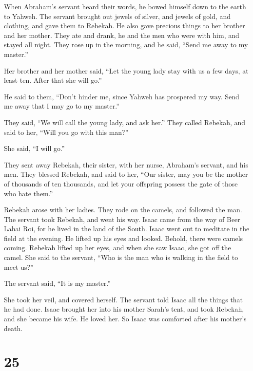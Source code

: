  When Abraham's servant heard their words, he bowed
himself down to the earth to Yahweh.  The servant brought
out jewels of silver, and jewels of gold, and clothing, and gave them to
Rebekah. He also gave precious things to her brother and her mother.
 They ate and drank, he and the men who were with him,
and stayed all night. They rose up in the morning, and he said, ``Send
me away to my master.''

 Her brother and her mother said, ``Let the young lady
stay with us a few days, at least ten. After that she will go.''

 He said to them, ``Don't hinder me, since Yahweh has
prospered my way. Send me away that I may go to my master.''

 They said, ``We will call the young lady, and ask her.''
 They called Rebekah, and said to her, ``Will you go with
this man?''

She said, ``I will go.''

 They sent away Rebekah, their sister, with her nurse,
Abraham's servant, and his men.  They blessed Rebekah,
and said to her, ``Our sister, may you be the mother of thousands of ten
thousands, and let your offspring possess the gate of those who hate
them.''

 Rebekah arose with her ladies. They rode on the camels,
and followed the man. The servant took Rebekah, and went his way.
 Isaac came from the way of Beer Lahai Roi, for he lived
in the land of the South.  Isaac went out to meditate in
the field at the evening. He lifted up his eyes and looked. Behold,
there were camels coming.  Rebekah lifted up her eyes,
and when she saw Isaac, she got off the camel.  She said
to the servant, ``Who is the man who is walking in the field to meet
us?''

The servant said, ``It is my master.''

She took her veil, and covered herself.  The servant told
Isaac all the things that he had done.  Isaac brought her
into his mother Sarah's tent, and took Rebekah, and she became his wife.
He loved her. So Isaac was comforted after his mother's death.

\hypertarget{section-24}{%
\section{25}\label{section-24}}

